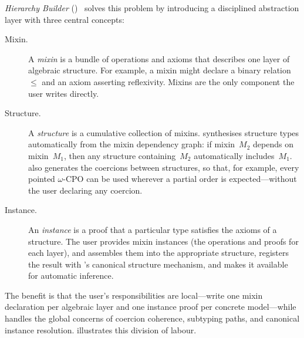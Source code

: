 \emph{Hierarchy Builder} (\HB{})~\cite{HB2023} solves this problem by
introducing a disciplined abstraction layer with three central concepts:
%
\begin{description}
  \item[Mixin.] A \emph{mixin} is a bundle of operations and axioms that
    describes one layer of algebraic structure.  For example, a mixin
    might declare a binary relation~$\le$ and an axiom asserting
    reflexivity.  Mixins are the only component the user writes
    directly.

  \item[Structure.] A \emph{structure} is a cumulative collection of
    mixins.  \HB{} synthesises structure types automatically from the
    mixin dependency graph: if mixin~$M_2$ depends on mixin~$M_1$, then
    any structure containing~$M_2$ automatically includes~$M_1$.  \HB{}
    also generates the coercions between structures, so that, for
    example, every pointed $\omega$-CPO can be used wherever a partial
    order is expected---without the user declaring any coercion.

  \item[Instance.] An \emph{instance} is a proof that a particular type
    satisfies the axioms of a structure.  The user provides mixin
    instances (the operations and proofs for each layer), and \HB{}
    assembles them into the appropriate structure, registers the result
    with \Rocq{}'s canonical structure mechanism, and makes it available
    for automatic inference.
\end{description}
%
The benefit is that the user's responsibilities are local---write one
mixin declaration per algebraic layer and one instance proof per concrete
model---while \HB{} handles the global concerns of coercion coherence,
subtyping paths, and canonical instance resolution.
 illustrates this division of labour.

